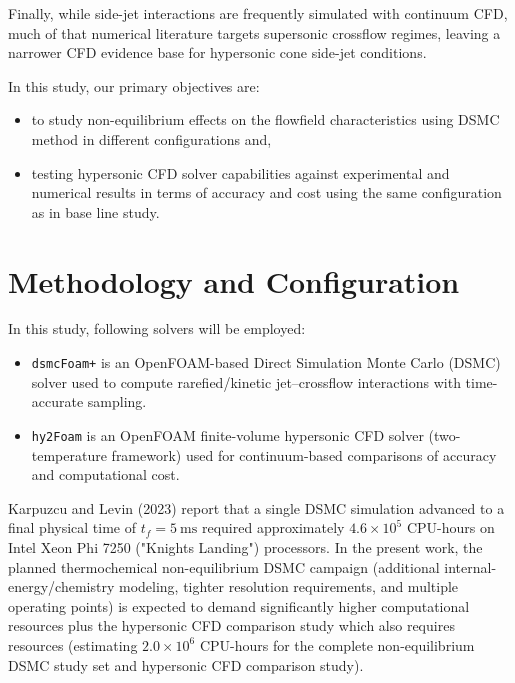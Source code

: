\documentclass[11pt]{article}
\begin{document}
Finally, while side-jet interactions are frequently simulated with continuum CFD, much of that numerical literature targets supersonic crossflow regimes, leaving a narrower CFD evidence base for hypersonic cone side-jet conditions.

In this study, our primary objectives are:
\begin{itemize}
    \item to study non-equilibrium effects on the flowfield characteristics using DSMC method in different configurations and,
    \item testing hypersonic CFD solver capabilities against experimental and numerical results in terms of accuracy and cost using the same configuration as in base line study.
\end{itemize}  

\section{Methodology and Configuration}
In this study, following solvers will be employed:
\begin{itemize}
    \item \texttt{dsmcFoam+} is an OpenFOAM-based Direct Simulation Monte Carlo (DSMC) solver used to compute rarefied/kinetic jet--crossflow interactions with time-accurate sampling. 
    \item \texttt{hy2Foam} is an OpenFOAM finite-volume hypersonic CFD solver (two-temperature framework) used for continuum-based comparisons of accuracy and computational cost.
\end{itemize}
Karpuzcu and Levin (2023) report that a single DSMC simulation advanced to a final physical time of $t_f=5~\mathrm{ms}$ required approximately $4.6\times 10^{5}$ CPU-hours on Intel Xeon Phi 7250 ("Knights Landing") processors. In the present work, the planned thermochemical non-equilibrium DSMC campaign (additional internal-energy/chemistry modeling, tighter resolution requirements, and multiple operating points) is expected to demand significantly higher computational resources plus the hypersonic CFD comparison study which also requires resources (estimating $2.0\times 10^{6}$ CPU-hours for the complete non-equilibrium DSMC study set and hypersonic CFD comparison study).
\end{document}
